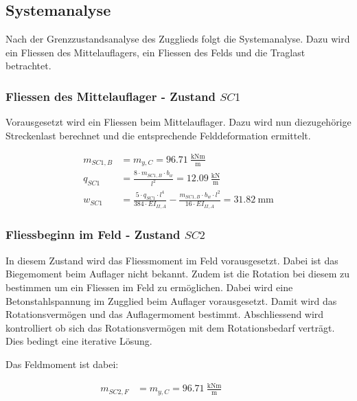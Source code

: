 \documentclass[
  11pt,
  letterpaper,
]{scrreprt}
\begin{document}
\subsection{Systemanalyse}\label{systemanalyse-1}

Nach der Grenzzustandsanalyse des Zugglieds folgt die Systemanalyse.
Dazu wird ein Fliessen des Mittelauflagers, ein Fliessen des Felds und
die Traglast betrachtet.

\subsubsection{\texorpdfstring{Fliessen des Mittelauflager - Zustand
\(SC1\)}{Fliessen des Mittelauflager - Zustand SC1}}\label{fliessen-des-mittelauflager---zustand-sc1}

Vorausgesetzt wird ein Fliessen beim Mittelauflager. Dazu wird nun
diezugehörige Streckenlast berechnet und die entsprechende
Felddeformation ermittelt.

\[
\begin{aligned}
m_{SC1 , B}& = m_{y , C} = 96.71 \ \frac{\mathrm{kNm}}{\mathrm{m}} \\ 
q_{SC1}& = \frac{8 \cdot m_{SC1 , B} \cdot b_{w}}{l^{2}} = 12.09 \ \frac{\mathrm{kN}}{\mathrm{m}} \\ 
w_{SC1}& = \frac{5 \cdot q_{SC1} \cdot l^{4}}{384 \cdot EI_{II , A}} - \frac{m_{SC1 , B} \cdot b_{w} \cdot l^{2}}{16 \cdot EI_{II , A}} = 31.82 \ \mathrm{mm} \end{aligned}
\]

\subsubsection{\texorpdfstring{Fliessbeginn im Feld - Zustand
\(SC2\)}{Fliessbeginn im Feld - Zustand SC2}}\label{fliessbeginn-im-feld---zustand-sc2}

In diesem Zustand wird das Fliessmoment im Feld vorausgesetzt. Dabei ist
das Biegemoment beim Auflager nicht bekannt. Zudem ist die Rotation bei
diesem zu bestimmen um ein Fliessen im Feld zu ermöglichen. Dabei wird
eine Betonstahlspannung im Zugglied beim Auflager vorausgesetzt. Damit
wird das Rotationsvermögen und das Auflagermoment bestimmt.
Abschliessend wird kontrolliert ob sich das Rotationsvermögen mit dem
Rotationsbedarf verträgt. Dies bedingt eine iterative Lösung.

Das Feldmoment ist dabei:

\[
\begin{aligned}
m_{SC2 , F}& = m_{y , C} = 96.71 \ \frac{\mathrm{kNm}}{\mathrm{m}} \quad &  \quad &  
 \end{aligned}
\]
\end{document}
